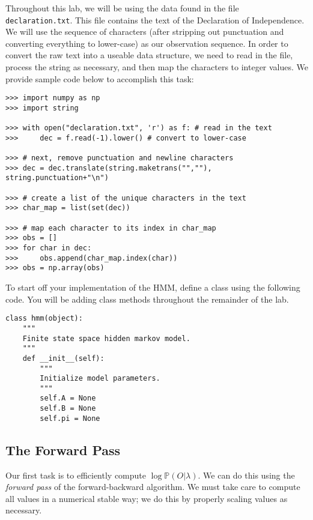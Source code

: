 Throughout this lab, we will be using the data found in the file {\tt declaration.txt}.
This file contains the text of the Declaration of Independence. 
We will use the sequence of characters (after stripping out punctuation and converting everything to lower-case) as our observation sequence.
In order to convert the raw text into a useable data structure, we need to read in the file, process the string as necessary, and then map the characters to integer values.
We provide sample code below to accomplish this task:
\begin{lstlisting}
>>> import numpy as np
>>> import string

>>> with open("declaration.txt", 'r') as f: # read in the text
>>>     dec = f.read(-1).lower() # convert to lower-case

>>> # next, remove punctuation and newline characters
>>> dec = dec.translate(string.maketrans("",""), string.punctuation+"\n")

>>> # create a list of the unique characters in the text
>>> char_map = list(set(dec))

>>> # map each character to its index in char_map
>>> obs = []
>>> for char in dec:
>>>     obs.append(char_map.index(char))
>>> obs = np.array(obs)
\end{lstlisting}

\begin{problem}
To start off your implementation of the HMM, define a class using the following code.
You will be adding class methods throughout the remainder of the lab.
\begin{lstlisting}
class hmm(object):
    """
    Finite state space hidden markov model.
    """
    def __init__(self):
        """
        Initialize model parameters.
        """
        self.A = None
        self.B = None
        self.pi = None
\end{lstlisting}
\end{problem}
\subsection*{The Forward Pass}
Our first task is to efficiently compute $\log \mathbb{P}(O | \lambda)$.
We can do this using the \emph{forward pass} of the forward-backward algorithm.
We must take care to compute all values in a numerical stable way; we do this by properly scaling values as necessary.

